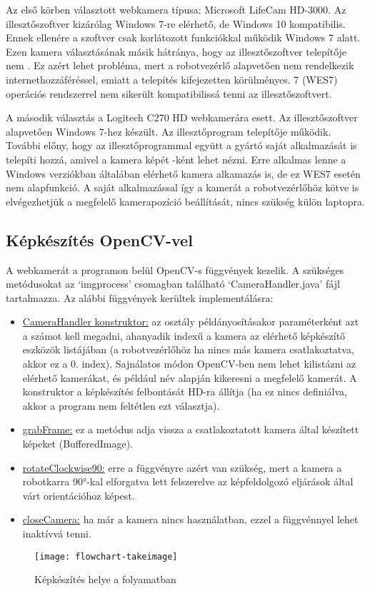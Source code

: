 \documentclass[../documentation.tex]{subfiles}
\begin{document}
Az első körben választott webkamera típusa: Microsoft LifeCam HD-3000. Az illesztőszoftver kizárólag Windows 7-re elérhető, de Windows 10 kompatibilis. Ennek ellenére a szoftver csak korlátozott funkciókkal működik Windows 7 alatt. Ezen kamera választásának másik hátránya, hogy az illesztőszoftver telepítője nem . Ez azért lehet probléma, mert a robotvezérlő alapvetően nem rendelkezik internethozzáféréssel, emiatt a telepítés kifejezetten körülményes.  7 (WES7) operációs rendszerrel nem sikerült kompatibilissá tenni az illesztőszoftvert.

A második választás a Logitech C270 HD webkamerára esett. Az illesztőszoftver alapvetően Windows 7-hez készült. Az illesztőprogram telepítője  működik. További előny, hogy az illesztőprogrammal együtt a gyártó saját alkalmazását is telepíti hozzá, amivel a kamera képét -ként lehet nézni. Erre alkalmas lenne a Windows verziókban általában elérhető kamera alkamazás is, de ez WES7 esetén nem alapfunkció. A saját alkalmazással így a kamerát a robotvezérlőhöz kötve is elvégezhetjük a megfelelő kamerapozíció beállítását, nincs szükség külön laptopra.



\subsection{Képkészítés OpenCV-vel}
A webkamerát a programon belül OpenCV-s függvények kezelik. A szükséges metódusokat az `imgprocess' csomagban található `CameraHandler.java' fájl tartalmazza. Az alábbi függvények kerültek implementálásra:
\begin{itemize}
	\item \underline{CameraHandler konstruktor:} az osztály példányosításakor paraméterként azt a számot kell megadni, ahanyadik indexű a kamera az elérhető képkészítő eszközök listájában (a robotvezérlőhöz ha nincs más kamera csatlakoztatva, akkor ez a 0. index). Sajnálatos módon OpenCV-ben nem lehet kilistázni az elérhető kamerákat, és például név alapján kikeresni a megfelelő kamerát. A konstruktor a képkészítés felbontását HD-ra állítja (ha ez nincs definiálva, akkor a program nem feltétlen ezt választja).
	\item \underline{grabFrame:} ez a metódus adja vissza a csatlakoztatott kamera által készített képeket (BufferedImage).
	\item \underline{rotateClockwise90:} erre a függvényre azért van szükség, mert a kamera a robotkarra 90°-kal elforgatva lett felszerelve az képfeldolgozó eljárások által várt orientációhoz képest.
	\item \underline{closeCamera:} ha már a kamera nincs használatban, ezzel a függvénnyel lehet inaktívvá tenni.
\end{itemize}

\begin{figure}[h]
	\centering
	\texttt{[image: flowchart-takeimage]}
	\caption{Képkészítés helye a folyamatban}
	\label{fig:camera}
\end{figure}
\end{document}
